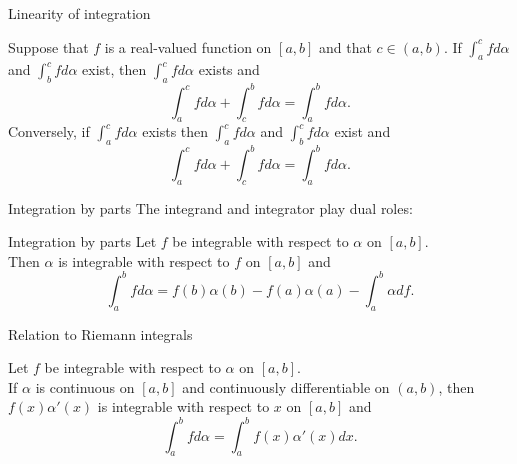 \documentclass{beamer}
\begin{document}
\begin{frame}{Linearity of integration}
\begin{thm}
Suppose that $f$ is a real-valued function on $[a,b]$ and that $c\in (a,b)$.
\pause
If $\int_a^c fd\alpha$ and $\int_b^c fd\alpha$ exist, then $\int_a^cfd\alpha$ exists and
$$\int_a^c fd\alpha + \int_c^b fd\alpha = \int_a^b fd\alpha.$$
\pause
Conversely, if $\int_a^c fd\alpha$ exists then $\int_a^c fd\alpha$ and $\int_b^c fd\alpha$ exist and
$$\int_a^c fd\alpha + \int_c^b fd\alpha = \int_a^b fd\alpha.$$
\end{thm}
\end{frame}

\begin{frame}{Integration by parts}
The integrand and integrator play dual roles:
\begin{thm}{Integration by parts}
Let $f$ be integrable with respect to $\alpha$ on $[a,b]$.\\
Then $\alpha$ is integrable with respect to $f$ on $[a,b]$ and
$$\int_a^b f d\alpha = f(b)\alpha(b)-f(a)\alpha(a)-\int_a^b \alpha df.$$
\end{thm}
\end{frame}

\begin{frame}{Relation to Riemann integrals}
\begin{thm}
Let $f$ be integrable with respect to $\alpha$ on $[a,b]$.\\
If $\alpha$ is continuous on $[a,b]$ and continuously differentiable on $(a,b)$, then
$f(x)\alpha'(x)$ is integrable with respect to $x$ on $[a,b]$ and
$$\int_a^b f d\alpha = \int_a^bf(x)\alpha'(x)dx.$$
\end{thm}
\end{frame}
\end{document}

